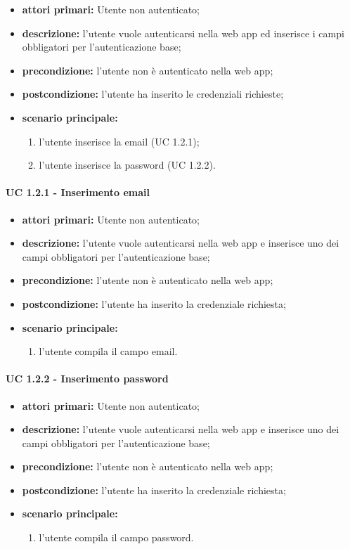 		\begin{itemize}
			\item \textbf{attori primari:} Utente non autenticato;
			\item \textbf{descrizione:} l'utente vuole autenticarsi nella web app ed inserisce i campi obbligatori per l'autenticazione base;
			\item \textbf{precondizione:} l'utente non è autenticato nella web app;
			\item \textbf{postcondizione:} l'utente ha inserito le credenziali richieste;
			\item \textbf{scenario principale:}
			\begin{enumerate}
				\item l'utente inserisce la email (UC 1.2.1);
				\item l'utente inserisce la password (UC 1.2.2).
			\end{enumerate}	
		\end{itemize}

			\paragraph{UC 1.2.1 - Inserimento email}
			\begin{itemize}
				\item \textbf{attori primari:} Utente non autenticato;
				\item \textbf{descrizione:} l'utente vuole autenticarsi nella web app e inserisce uno dei campi obbligatori per l'autenticazione base;
				\item \textbf{precondizione:} l'utente non è autenticato nella web app;
				\item \textbf{postcondizione:} l'utente ha inserito la credenziale richiesta;
				\item \textbf{scenario principale:}
				\begin{enumerate}
					\item l'utente compila il campo email.
				\end{enumerate}	
			\end{itemize}

			\paragraph{UC 1.2.2 - Inserimento password}
			\begin{itemize}
				\item \textbf{attori primari:} Utente non autenticato;
				\item \textbf{descrizione:} l'utente vuole autenticarsi nella web app e inserisce uno dei campi obbligatori per l'autenticazione base;
				\item \textbf{precondizione:} l'utente non è autenticato nella web app;
				\item \textbf{postcondizione:} l'utente ha inserito la credenziale richiesta;
				\item \textbf{scenario principale:}
				\begin{enumerate}
					\item l'utente compila il campo password.
				\end{enumerate}	
			\end{itemize}

